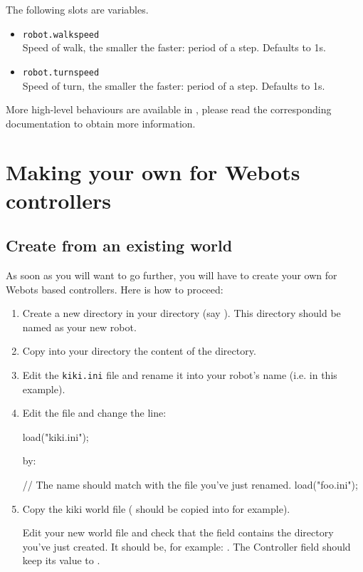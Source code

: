 The following slots are variables.
\begin{itemize}
\item \lstinline|robot.walkspeed|\\
  Speed of walk, the smaller the faster: period of a step. Defaults to
  1s.
\item \lstinline|robot.turnspeed|\\
  Speed of turn, the smaller the faster: period of a step. Defaults to
  1s.
\end{itemize}

More high-level behaviours are available in , please read
the corresponding documentation to obtain more information.


\section{Making your own \urbi for Webots controllers}

\subsection{Create from an existing world}

As soon as you will want to go further, you will have to create your
own \urbi for Webots based controllers. Here is how to proceed:

\begin{enumerate}

\item Create a new directory in your  directory (say
  ). This directory should be named as your new robot.

\item Copy into your  directory the content of the
   directory.

\item Edit the \nolinkurl{kiki.ini} file and rename it into your
  robot's name (i.e.  in this example).

\item Edit the  file and change the line:

\begin{urbifixme}
load("kiki.ini");
\end{urbifixme}

by:

\begin{urbifixme}
// The name should match with the file you've just renamed.
load("foo.ini");
\end{urbifixme}

\item Copy the kiki world file ( should be
  copied into  for example).

  Edit your new world file and check that the field
   contains the directory you've just created. It
  should be, for example: .  The Controller field should
  keep its value to .
\end{enumerate}

